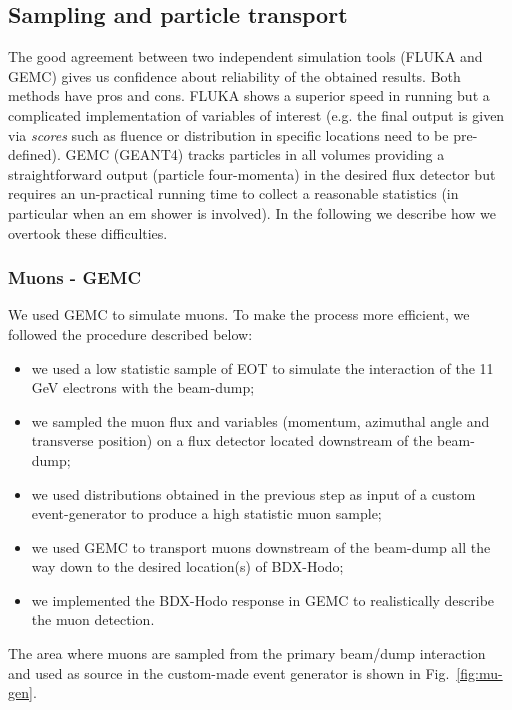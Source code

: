 \subsection{Sampling  and particle transport}\label{sec:sampling}
The good agreement between two independent simulation tools (FLUKA and GEMC)  gives us confidence about reliability of the obtained results. Both methods have pros and cons. FLUKA shows a superior speed in running but a complicated implementation of  variables of interest  (e.g. the final output is given via {\it scores} such as fluence or distribution in specific locations  need to be pre-defined). GEMC (GEANT4) tracks particles in all volumes providing a straightforward  output (particle four-momenta) in the desired flux detector but requires an un-practical running time to collect a reasonable statistics (in particular when an em shower is involved). In the following we describe how we overtook these difficulties.

\subsubsection{Muons - GEMC}\label{sec:gmc-mu}
We used GEMC to simulate muons. To make the  process more efficient, we followed the   procedure described below: 
\begin{itemize}
\item  we used a low statistic sample of EOT to simulate the interaction of the 11 GeV electrons with the beam-dump;
\item  we sampled the muon flux and variables (momentum, azimuthal angle and transverse position)  on a flux detector located downstream of the beam-dump;
\item we used  distributions obtained  in the  previous step as input of a custom event-generator to produce a high statistic muon sample;
\item we used GEMC to transport muons  downstream of the beam-dump all the way down to the desired location(s) of  BDX-Hodo;
\item  we implemented  the  BDX-Hodo response in GEMC to realistically describe the muon detection.
\end{itemize}
The area where  muons are sampled from the primary beam/dump interaction and used  as source in the custom-made event generator is shown in Fig.~\ref{fig:mu-gen}.


